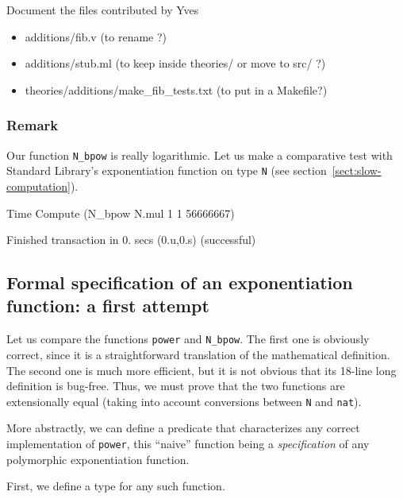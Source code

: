 \begin{todo}
Document the files contributed by Yves
\begin{itemize}
\item additions/fib.v (to rename ?)
\item additions/stub.ml (to keep inside theories/ or move to src/ ?)
\item theories/additions/make\_fib\_tests.txt (to put in a Makefile?)
\end{itemize}
\end{todo}


\subsubsection{Remark}
\label{sect:faster}

Our function \texttt{N\_bpow} is really logarithmic. Let us make a comparative 
test with Standard Library's exponentiation function on type \texttt{N} (see section~\vref{sect:slow-computation}).

\begin{Coqsrc}
Time Compute (N_bpow N.mul 1 1 56666667)%
\end{Coqsrc}

\begin{Coqanswer}
Finished transaction in 0. secs (0.u,0.s) (successful)  
\end{Coqanswer}




\subsection{Formal specification of an exponentiation function: a first attempt}

Let us compare the functions \texttt{power} and \texttt{N\_bpow}.
The first one is obviously correct, since it is a straightforward translation of the mathematical definition.
The second one is much more efficient, but it is not obvious  that its 18-line long definition is bug-free.
Thus, we must prove that the two functions are extensionally equal (taking into account conversions
between \texttt{N} and \texttt{nat}).

More abstractly, we can define a predicate that characterizes any correct implementation 
of \texttt{power}, this ``naive''  function being a \emph{specification} of any polymorphic
exponentiation function.

First, we define a type for any such function.


